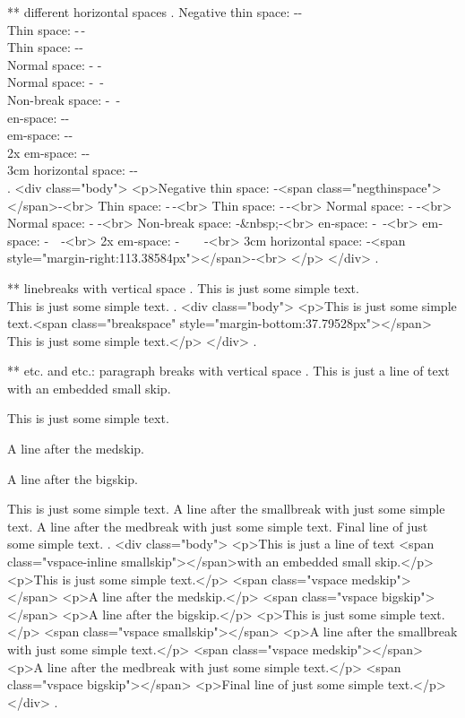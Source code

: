 ** different horizontal spaces
.
Negative thin space: -\negthinspace- \\
Thin space: -\,- \\
Thin space: -\thinspace- \\
Normal space: - - \\
Normal space: -\ - \\
Non-break space: -~- \\
en-space: -\enspace- \\
em-space: -\quad- \\
2x em-space: -\qquad-\\
3cm horizontal space: -\hspace{3cm}- \\
.
<div class="body">
<p>Negative thin space: ‐<span class="negthinspace"></span>‐<br>
Thin space: ‐ ‐<br>
Thin space: ‐ ‐<br>
Normal space: ‐ ‐<br>
Normal space: ‐​ ‐<br>
Non‐break space: ‐&nbsp;‐<br>
en‐space: ‐ ‐<br>
em‐space: ‐ ‐<br>
2x em‐space: ‐  ‐<br>
3cm horizontal space: ‐<span style="margin-right:113.38584px"></span>‐<br>
</p>
</div>
.


** linebreaks with vertical space
.
This is just some simple text.\\[1cm]
This is just some simple text.
.
<div class="body">
<p>This is just some simple text.<span class="breakspace" style="margin-bottom:37.79528px"></span>
This is just some simple text.</p>
</div>
.


** \smallskip etc. and \smallbreak etc.: paragraph breaks with vertical space
.
This is just a line of text \smallskip with an embedded small skip.

This is just some simple text.

\medskip
A line after the medskip.

\bigskip

A line after the bigskip.

This is just some simple text.
\smallbreak
A line after the smallbreak with just some simple text.
\medbreak
A line after the medbreak with just some simple text.
\bigbreak
Final line of just some simple text.
.
<div class="body">
<p>This is just a line of text <span class="vspace-inline smallskip"></span>with an embedded small skip.</p>
<p>This is just some simple text.</p>
<span class="vspace medskip"></span>
<p>A line after the medskip.</p>
<span class="vspace bigskip"></span>
<p>A line after the bigskip.</p>
<p>This is just some simple text.</p>
<span class="vspace smallskip"></span>
<p>A line after the smallbreak with just some simple text.</p>
<span class="vspace medskip"></span>
<p>A line after the medbreak with just some simple text.</p>
<span class="vspace bigskip"></span>
<p>Final line of just some simple text.</p>
</div>
.


